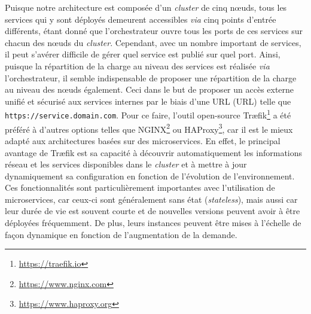 Puisque notre architecture est composée d'un \textit{cluster} de cinq n\oe{}uds, tous les services qui y sont déployés demeurent accessibles \textit{via} cinq points d'entrée différents, étant donné que l'orchestrateur ouvre tous les ports de ces services sur chacun des n\oe{}uds du \textit{cluster}. Cependant, avec un nombre important de services, il peut s'avérer difficile de gérer quel service est publié sur quel port. Ainsi, puisque la répartition de la charge au niveau des services est réalisée \textit{via} l'orchestrateur, il semble indispensable de proposer une répartition de la charge au niveau des n\oe{}uds également. Ceci dans le but de proposer un accès externe unifié et sécurisé aux services internes par le biais d'une \acs{URL} (\acl{URL}) telle que \texttt{https://service.domain.com}. Pour ce faire, l'outil open-source Tr\ae{}fik\footnote{\url{https://traefik.io}} a été préféré à d'autres options telles que NGINX\footnote{\url{https://www.nginx.com}} ou HAProxy\footnote{\url{https://www.haproxy.org}}, car il est le mieux adapté aux architectures basées sur des microservices. En effet, le principal avantage de Tr\ae{}fik est sa capacité à découvrir automatiquement les informations réseau et les services disponibles dans le \textit{cluster} et à mettre à jour dynamiquement sa configuration en fonction de l'évolution de l'environnement. Ces fonctionnalités sont particulièrement importantes avec l'utilisation de  microservices, car ceux-ci sont généralement sans état (\textit{stateless}), mais aussi car leur durée de vie est souvent courte et de nouvelles versions peuvent avoir à être déployées fréquemment. De plus, leurs instances peuvent être mises à l'échelle de façon dynamique en fonction de l'augmentation de la demande.


